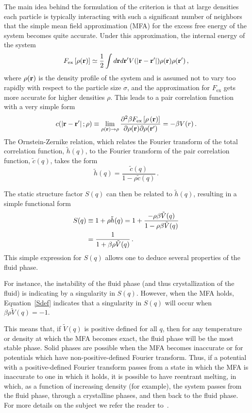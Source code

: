 {The main idea behind the formulation of the criterion is that at large densities each particle is typically  interacting with such a 
significant  number of neighbors that the simple mean field approximation (MFA) for the excess free energy of the system becomes quite accurate.
Under this approximation, the internal energy of the system
\begin{equation}
	F_{\textrm {ex}}\left[\rho({\bf {r}})\right] \simeq \frac{1}{2}\int d{\bf {r}} d{\bf {r'}} V(\left|{\bf {r}} - {\bf {r'}}\right|)\rho({\bf {r}}) \rho({\bf {r'}}) \,,
\end{equation}
where $\rho(\bf{r})$ is the density profile of the system and is assumed not to vary too rapidly with respect to the particle size $\sigma$, and the approximation for $F_{\textrm {ex}}$ gets more accurate for higher densities $\rho$.
This leads to a pair correlation function with a very simple form
\begin{equation}
	c(\left|{\bf{r}}-{\bf{r'}}\right|;\rho) \equiv \lim_{\rho({\bf{r}}) \rightarrow \rho} \frac{\partial^2 \beta F_{\textrm{ex}}\left[\rho\left({\bf{r}}\right)\right]}{\partial \rho({\bf{r}}) \partial \rho({\bf{r'}})} = -\beta V(r) \,. 
\end{equation}
The Ornstein-Zernike relation, which relates the Fourier transform of the total correlation function, $\tilde{h}(q)$, to the Fourier transform of the pair correlation function, $\tilde{c}(q)$, takes the form
\begin{equation}
	\tilde{h}(q) = \frac{\tilde{c}(q)}{1 - \rho \tilde{c}(q)} \,.
\end{equation}

The static structure factor $S(q)$ can then be related to $\tilde{h}(q)$, resulting in a simple functional form
\begin{align}
	S(q) &\equiv 1 + \rho\tilde{h}(q) = 1 + \frac{-\rho \beta \tilde{V}(q)}{1 - \rho \beta\tilde{V}(q)} \notag \\
	&= \frac{1}{1 + \beta\rho\tilde{V}(q)} \,. \label{Sdef}
\end{align}
This simple expression for $S(q)$ allows one to deduce several  properties of the fluid phase.

For instance, the instability of the fluid phase (and thus crystallization of the fluid) is indicating by a singularity in $S(q)$.
However, when the MFA holds, Equation~\ref{Sdef} indicates that a singularity in $S(q)$ will occur when $\beta\rho\tilde{V}(q) = -1$.

This means that, if $\tilde{V}(q)$ is positive defined for all $q$, then for any temperature or density at which the MFA becomes exact, the fluid phase will be the most stable phase.
Solid phases are possible when the MFA becomes inaccurate or for potentials which have non-positive-defined Fourier transform.
Thus, if a potential with a positive-defined Fourier transform passes from a state in which the MFA is inaccurate to one in which it holds, it is possible to have reentrant melting, in which, as a function of increasing density (for example), the system passes from the fluid phase, through a crystalline phases, and then back to the fluid phase.
For more details on the subject we refer the reader to~\cite{likos}.} 

